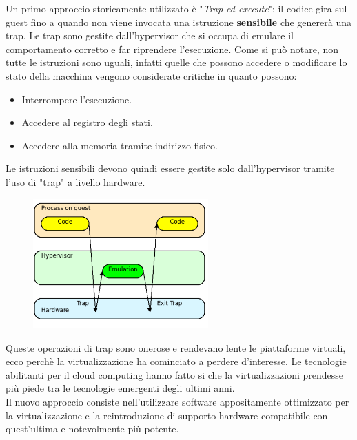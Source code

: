 \documentclass{article}
\begin{document}
		Un primo approccio storicamente utilizzato è "\emph{Trap ed execute}": il codice gira sul guest fino a quando non viene invocata una istruzione \textbf{sensibile} che genererà una trap. Le trap sono gestite dall'hypervisor che si occupa di emulare il comportamento corretto e far riprendere l'esecuzione. Come si può notare, non tutte le istruzioni sono uguali, infatti quelle che possono accedere o modificare lo stato della macchina vengono considerate critiche in quanto possono:
		\begin{itemize}
		    \item Interrompere l'esecuzione.
		    \item Accedere al registro degli stati.
		    \item Accedere alla memoria tramite indirizzo fisico.
		\end{itemize}
		Le istruzioni sensibili devono quindi essere gestite solo dall'hypervisor tramite l'uso di 
		"trap" a livello hardware.
		\begin{figure}[ht]
		    \centering
		    \includegraphics[width=0.6\textwidth]{SAC_B1_hypervisorTrap.png}
		\end{figure}
		Queste operazioni di trap sono onerose e rendevano lente le piattaforme virtuali, ecco perchè la virtualizzazione ha cominciato a perdere d'interesse. Le tecnologie abilitanti per il cloud computing hanno fatto si che la virtualizzazioni prendesse più piede tra le tecnologie emergenti degli ultimi anni.\\
		Il nuovo approccio consiste nell'utilizzare software appositamente ottimizzato per la virtualizzazione e la reintroduzione di supporto hardware compatibile con quest'ultima e notevolmente più potente. 
		
\end{document}
